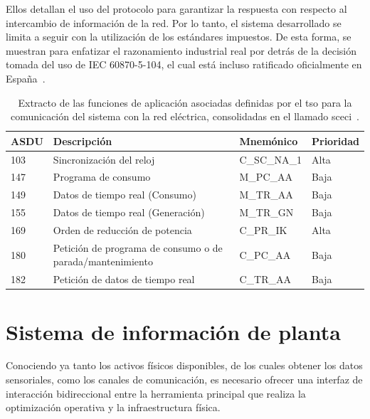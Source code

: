 Ellos detallan el uso del protocolo para garantizar la respuesta con respecto al intercambio de información de la red. Por lo tanto, el sistema desarrollado se limita a seguir con la utilización de los estándares impuestos. De esta forma, se muestran para enfatizar el razonamiento industrial real por detrás de la decisión tomada del uso de IEC 60870-5-104, el cual está incluso ratificado oficialmente en España~\cite{une2017equipos}.

\begin{table}[ht]
  \centering
  \begin{tabular}{|l|p{7.5cm}|l|l|}
    \hline
    ASDU & Descripción                                               & Mnemónico   & Prioridad \\
    \hline
    103  & Sincronización del reloj                                  & C\_SC\_NA\_1 & Alta     \\
    147  & Programa de consumo                                       & M\_PC\_AA    & Baja     \\
    149  & Datos de tiempo real (Consumo)                            & M\_TR\_AA    & Baja     \\
    155  & Datos de tiempo real (Generación)                         & M\_TR\_GN    & Baja     \\
    169  & Orden de reducción de potencia                            & C\_PR\_IK    & Alta     \\
    180  & Petición de programa de consumo o de parada/mantenimiento & C\_PC\_AA    & Baja     \\
    182  & Petición de datos de tiempo real                          & C\_TR\_AA    & Baja     \\
    \hline
  \end{tabular}
  \caption[Funciones de aplicación para la comunicación con la red eléctrica.]{Extracto de las funciones de aplicación asociadas definidas por el \gls{tso} para la comunicación del sistema con la red eléctrica, consolidadas en el llamado \gls{sceci}~\cite{ree2009protocolo}.}
  \label{tab:funciones-de-aplicación-red}
\end{table}

\section{Sistema de información de planta}
\label{makereference3.4}

Conociendo ya tanto los activos físicos disponibles, de los cuales obtener los datos sensoriales, como los canales de comunicación, es necesario ofrecer una interfaz de interacción bidireccional entre la herramienta principal que realiza la optimización operativa y la infraestructura física.

